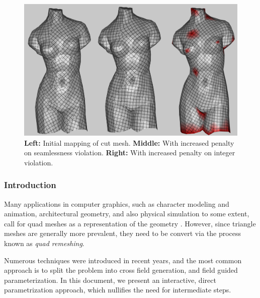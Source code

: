 % 
% 
%
\begin{figure}[ht]
\centering
\includegraphics[width=15cm]{figures/teaser.png}
\caption[Abstract's Teaser]{\textbf{Left:} Initial mapping of cut mesh. \textbf{Middle:} With increased penalty on seamlessness violation. \textbf{Right:} With increased penalty on integer violation.}
\label{fig:teaser}
\end{figure}

\subsubsection{Introduction}
Many applications in computer graphics, such as character modeling and animation, architectural geometry, and also physical simulation to some extent, call for quad meshes as a representation of the geometry \cite{10.1111/cgf.12014}. However, since triangle meshes are generally more prevalent, they need to be convert via the process known as \emph{quad remeshing}.

\noindent Numerous techniques were introduced in recent years, and the most common approach is to split the problem into cross field generation, and field guided parameterization. In this document, we present an interactive, direct parametrization approach, which nullifies the need for intermediate steps.

